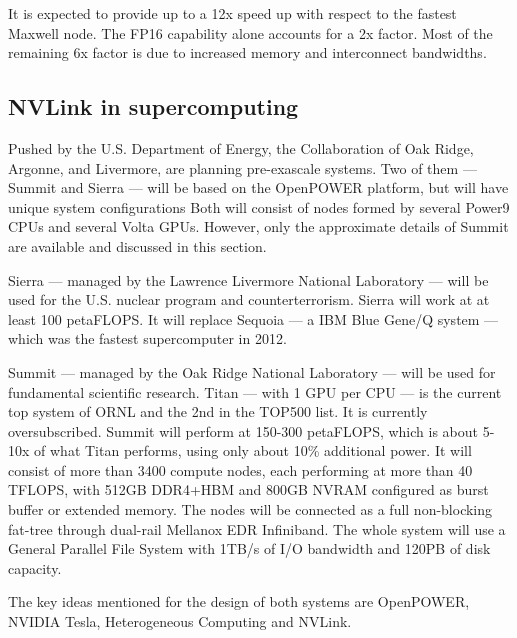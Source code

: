It is expected to provide up to a 12x speed up with respect to the fastest Maxwell node.
The FP16 capability alone accounts for a 2x factor.
Most of the remaining 6x factor is due to increased memory and interconnect bandwidths.


\subsection{NVLink in supercomputing \cite{nvidia:summitsierrawhitepaper}} \label{subsec:nvlsupercomp}
Pushed by the U.S. Department of Energy, the Collaboration of Oak Ridge, Argonne, and Livermore, are planning pre-exascale systems.
Two of them --- Summit and Sierra --- will be based on the OpenPOWER platform, but will have unique system configurations
Both will consist of nodes formed by several Power9 CPUs and several Volta GPUs.
However, only the approximate details of Summit are available and discussed in this section.

Sierra --- managed by the Lawrence Livermore National Laboratory --- will be used for the U.S. nuclear program and counterterrorism.
Sierra will work at at least 100 petaFLOPS.
It will replace Sequoia --- a IBM Blue Gene/Q system --- which was the fastest supercomputer in 2012.

Summit --- managed by the Oak Ridge National Laboratory --- will be used for fundamental scientific research.
Titan --- with 1 GPU per CPU --- is the current top system of ORNL and the 2nd in the TOP500 list.
It is currently oversubscribed.
Summit will perform at 150-300 petaFLOPS, which is about 5-10x of what Titan performs, using only about 10\% additional power.
It will consist of more than 3400 compute nodes, each performing at more than 40 TFLOPS, with 512GB DDR4+HBM and 800GB NVRAM configured as burst buffer or extended memory.
The nodes will be connected as a full non-blocking fat-tree through dual-rail Mellanox EDR Infiniband.
The whole system will use a General Parallel File System with 1TB/s of I/O bandwidth and 120PB of disk capacity.

The key ideas mentioned for the design of both systems are OpenPOWER, NVIDIA Tesla, Heterogeneous Computing and NVLink.
